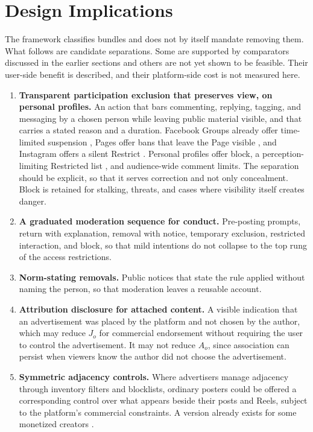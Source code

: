 \section{Design Implications}\label{sec:design}

The framework classifies bundles and does not by itself mandate removing them. What follows are candidate separations. Some are supported by comparators discussed in the earlier sections and others are not yet shown to be feasible. Their user-side benefit is described, and their platform-side cost is not measured here.

\begin{enumerate}
  \item \textbf{Transparent participation exclusion that preserves view, on personal profiles.} An action that bars commenting, replying, tagging, and messaging by a chosen person while leaving public material visible, and that carries a stated reason and a duration. Facebook Groups already offer time-limited suspension \cite{fb-groups}, Pages offer bans that leave the Page visible \cite{page-ban}, and Instagram offers a silent Restrict \cite{ig-restrict}. Personal profiles offer block, a perception-limiting Restricted list \cite{fb-restricted}, and audience-wide comment limits. The separation should be explicit, so that it serves correction and not only concealment. Block is retained for stalking, threats, and cases where visibility itself creates danger.
  \item \textbf{A graduated moderation sequence for conduct.} Pre-posting prompts, return with explanation, removal with notice, temporary exclusion, restricted interaction, and block, so that mild intentions do not collapse to the top rung of the access restrictions.
  \item \textbf{Norm-stating removals.} Public notices that state the rule applied without naming the person, so that moderation leaves a reusable account.
  \item \textbf{Attribution disclosure for attached content.} A visible indication that an advertisement was placed by the platform and not chosen by the author, which may reduce $J_o$ for commercial endorsement without requiring the user to control the advertisement. It may not reduce $A_o$, since association can persist when viewers know the author did not choose the advertisement.
  \item \textbf{Symmetric adjacency controls.} Where advertisers manage adjacency through inventory filters and blocklists, ordinary posters could be offered a corresponding control over what appears beside their posts and Reels, subject to the platform's commercial constraints. A version already exists for some monetized creators \cite{sej-overlay}.

\end{enumerate}
